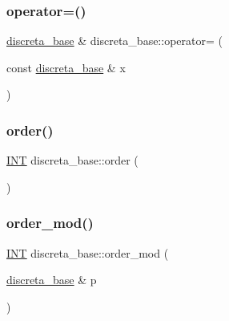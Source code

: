 \mbox{\label{classdiscreta__base_a4ccf158b3864d95b4e85fa471c748bae}} 
\subsubsection{\texorpdfstring{operator=()}{operator=()}}
{\footnotesize\ttfamily \mbox{\hyperlink{classdiscreta__base}{discreta\+\_\+base}} \& discreta\+\_\+base\+::operator= (\begin{DoxyParamCaption}\item[{const \mbox{\hyperlink{classdiscreta__base}{discreta\+\_\+base}} \&}]{x }\end{DoxyParamCaption})}

\mbox{\label{classdiscreta__base_a4ce6b54534e4882c48c051c03ac76e52}} 
\subsubsection{\texorpdfstring{order()}{order()}}
{\footnotesize\ttfamily \mbox{\hyperlink{galois_8h_a09fddde158a3a20bd2dcadb609de11dc}{I\+NT}} discreta\+\_\+base\+::order (\begin{DoxyParamCaption}{ }\end{DoxyParamCaption})}

\mbox{\label{classdiscreta__base_aee39628b4299a335baca784802ac0f3c}} 
\subsubsection{\texorpdfstring{order\+\_\+mod()}{order\_mod()}}
{\footnotesize\ttfamily \mbox{\hyperlink{galois_8h_a09fddde158a3a20bd2dcadb609de11dc}{I\+NT}} discreta\+\_\+base\+::order\+\_\+mod (\begin{DoxyParamCaption}\item[{\mbox{\hyperlink{classdiscreta__base}{discreta\+\_\+base}} \&}]{p }\end{DoxyParamCaption})}

